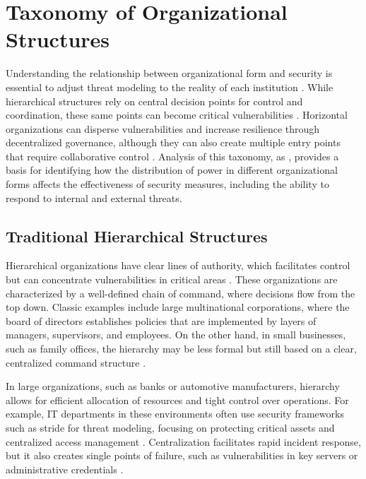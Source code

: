 \section{Taxonomy of Organizational Structures}
\label{sec:taxonomy_organizational_structures}

Understanding the relationship between organizational form and security is
essential to adjust threat modeling to the reality of each institution
\cite{Non-HierarchicalForms}. While hierarchical structures rely on central
decision points for control and coordination, these same points can become
critical vulnerabilities \cite{ThreatModelingdesigningForSecurity}. Horizontal
organizations can disperse vulnerabilities and increase resilience
through decentralized governance, although they can also create
multiple entry points that require collaborative control \cite{Colbac}. Analysis
of this taxonomy, as \cite{WorkerCooperativesinAmerica,
RealNotNominalGlobalDemocracy}, provides a basis for identifying how the
distribution of power in different organizational forms affects the
effectiveness of security measures, including the ability to respond to internal
and external threats.

\subsection{Traditional Hierarchical Structures}
\label{subsec:traditional_hierarchical_structures}

Hierarchical organizations have clear lines of authority, which facilitates
control but can concentrate vulnerabilities in critical areas
\cite{MicrosoftThreatModelingTechnique}. These organizations are characterized
by a well-defined chain of command, where decisions flow from the top down.
Classic examples include large multinational corporations, where the board of
directors establishes policies that are implemented by layers of managers,
supervisors, and employees. On the other hand, in small businesses, such as
family offices, the hierarchy may be less formal but still based on a clear,
centralized command structure \cite{WorkerCooperativesinAmerica}.

In large organizations, such as banks or automotive manufacturers, hierarchy
allows for efficient allocation of resources and tight control over operations.
For example, IT departments in these environments often use security frameworks
such as \gls{stride} for threat modeling, focusing on protecting critical assets
and centralized access management \cite{MicrosoftThreatModelingTechnique,
ThreatModelingASystematicLiteratureReview}. Centralization facilitates rapid
incident response, but it also creates single points of failure, such as
vulnerabilities in key servers or administrative credentials
\cite{DoArtifactsHavePolitics, BigTech}.

